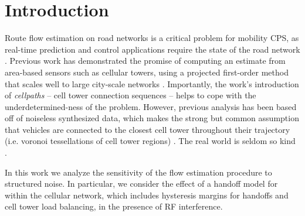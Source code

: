 
\section{Introduction}
Route flow estimation on road networks is a critical problem for mobility CPS, as real-time prediction and control applications require the state of the road network \cite{Faouzi2011,Mathew2014}. Previous work has demonstrated the promise of computing an estimate from area-based sensors such as cellular towers, using a projected first-order method that scales well to large city-scale networks \cite{Wu2015}. Importantly, the work's introduction of \textit{cellpaths} -- cell tower connection sequences -- helps to cope with the underdetermined-ness of the problem. However, previous analysis has been based off of noiseless synthesized data, which makes the strong but common assumption that vehicles are connected to the closest cell tower throughout their trajectory (i.e. voronoi tessellations of cell tower regions) \cite{Voronoi1908}. The real world is seldom so kind \cite{Caceres2012a,Kieslich2013}.

In this work we analyze the sensitivity of the flow estimation procedure to structured noise. In particular, we consider the effect of a handoff model for within the cellular network, which includes hysteresis margins for handoffs and cell tower load balancing, in the presence of RF interference.
